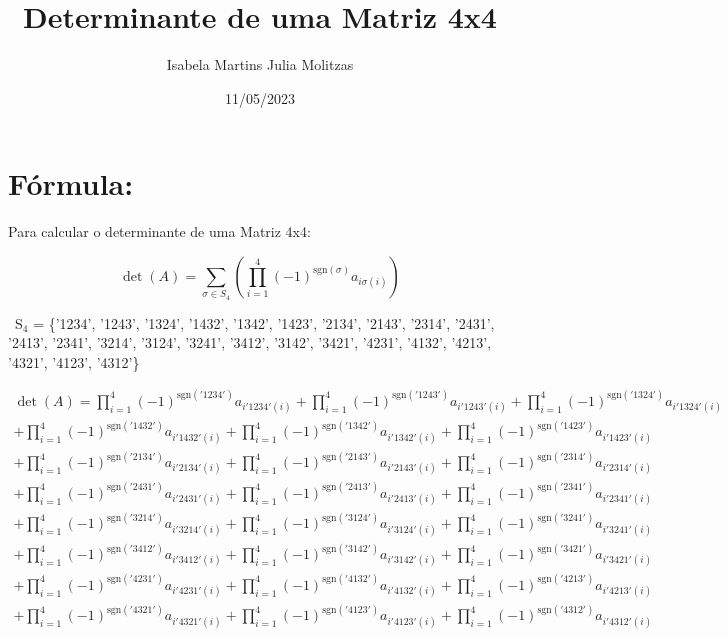 \documentclass{article}
\title{Determinante de uma Matriz 4x4}
\author{Isabela Martins \hspace{0.1cm} Julia Molitzas}
\date{11/05/2023}
\begin{document}
\maketitle

\newpage

\section{Fórmula:}

Para calcular o determinante de uma Matriz 4x4: 

\[
\det(A) = \sum_{\sigma \in S_4} \left( \prod_{i=1}^{4} (-1)^{\mathrm{sgn}(\sigma)} a_{i\sigma(i)} \right)
\]\newline

\ {S}$_4$ = \{'1234', '1243', '1324', '1432', '1342', '1423', 
'2134', '2143', '2314', '2431', '2413', '2341', 
'3214', '3124', '3241', '3412', '3142', '3421', 
'4231', '4132', '4213', '4321', '4123', '4312'\}\newline

\begin{equation*}
    \begin{split}
    \det(A)=
    \prod_{i=1}^{4} (-1)^{\mathrm{sgn}('1234')} a_{i'1234'(i)} 
    + \prod_{i=1}^{4} (-1)^{\mathrm{sgn}('1243')} a_{i'1243'(i)} 
    + \prod_{i=1}^{4} (-1)^{\mathrm{sgn}('1324')} a_{i'1324'(i)}\\
    + \prod_{i=1}^{4} (-1)^{\mathrm{sgn}('1432')} a_{i'1432'(i)} 
    + \prod_{i=1}^{4} (-1)^{\mathrm{sgn}('1342')} a_{i'1342'(i)} 
    + \prod_{i=1}^{4} (-1)^{\mathrm{sgn}('1423')} a_{i'1423'(i)}\\
    + \prod_{i=1}^{4} (-1)^{\mathrm{sgn}('2134')} a_{i'2134'(i)} 
    + \prod_{i=1}^{4} (-1)^{\mathrm{sgn}('2143')} a_{i'2143'(i)} 
    + \prod_{i=1}^{4} (-1)^{\mathrm{sgn}('2314')} a_{i'2314'(i)}\\ 
    + \prod_{i=1}^{4} (-1)^{\mathrm{sgn}('2431')} a_{i'2431'(i)} 
    + \prod_{i=1}^{4} (-1)^{\mathrm{sgn}('2413')} a_{i'2413'(i)} 
    + \prod_{i=1}^{4} (-1)^{\mathrm{sgn}('2341')} a_{i'2341'(i)}\\ 
    + \prod_{i=1}^{4} (-1)^{\mathrm{sgn}('3214')} a_{i'3214'(i)} 
    + \prod_{i=1}^{4} (-1)^{\mathrm{sgn}('3124')} a_{i'3124'(i)} 
    + \prod_{i=1}^{4} (-1)^{\mathrm{sgn}('3241')} a_{i'3241'(i)}\\
    + \prod_{i=1}^{4} (-1)^{\mathrm{sgn}('3412')} a_{i'3412'(i)} 
    + \prod_{i=1}^{4} (-1)^{\mathrm{sgn}('3142')} a_{i'3142'(i)} 
    + \prod_{i=1}^{4} (-1)^{\mathrm{sgn}('3421')} a_{i'3421'(i)}\\
    + \prod_{i=1}^{4} (-1)^{\mathrm{sgn}('4231')} a_{i'4231'(i)}
    + \prod_{i=1}^{4} (-1)^{\mathrm{sgn}('4132')} a_{i'4132'(i)}
    + \prod_{i=1}^{4} (-1)^{\mathrm{sgn}('4213')} a_{i'4213'(i)}\\
    + \prod_{i=1}^{4} (-1)^{\mathrm{sgn}('4321')} a_{i'4321'(i)}
    + \prod_{i=1}^{4} (-1)^{\mathrm{sgn}('4123')} a_{i'4123'(i)}
    + \prod_{i=1}^{4} (-1)^{\mathrm{sgn}('4312')} a_{i'4312'(i)}
    \end{split}
\end{equation*}
\end{document}
